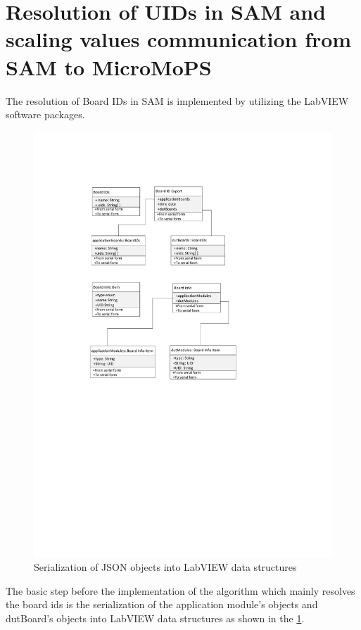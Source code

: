 \section{Resolution of UIDs in SAM and scaling values communication from SAM to MicroMoPS}
The resolution of Board IDs in SAM is implemented by utilizing the LabVIEW software packages. 
\begin{figure}[hbt]
		\centering
		\includegraphics[trim=180 670 0 140, clip, width=210mm, scale=0.75]{images/board_objects.pdf}
		\caption{Serialization of JSON objects into LabVIEW data structures}
		\label{fig:Serialization}
\end{figure}
The basic step before the implementation of the algorithm which mainly resolves the board ids is the serialization of the application module's objects and dutBoard's objects into LabVIEW data structures as shown in the \cref{fig:Serialization}.

